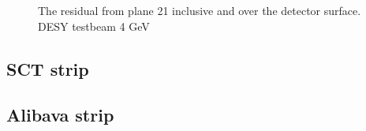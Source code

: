 \begin{figure}[H]
\hspace{-35mm}
\caption{The residual from plane 21 inclusive and over the detector surface. DESY testbeam 4 GeV}
\label{fig:kinkRad}
\end{figure}


\subsection{SCT strip}

\subsection{Alibava strip}

